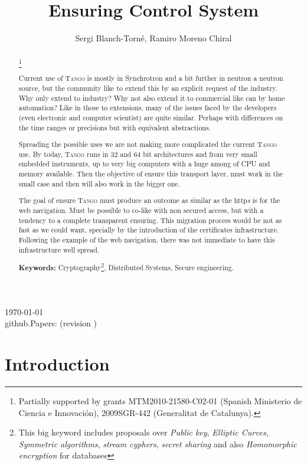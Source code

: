 \documentclass[10pt,a4paper,twoside]{llncs}
\title{Ensuring \tango Control System}
\author{Sergi Blanch-Torn\'e\inst{1}, Ramiro Moreno Chiral\inst{2}}
\institute{
 Escola Polit\`ecnica Superior, Universitat de Lleida. Spain.\\
 \email{\tt sblanch@alumnes.udl.es}
 \and 
 Departament de Matem\`atica. Universitat de Lleida. Spain.\\
 \email{\tt ramiro@matematica.udl.es}
 }
\newcommand{\version}{github.Papers: \gitCommitterDate\;(revision \gitAbbrevHash) }
\newcommand{\tango}{\textsc{Tango} }
\begin{document}
\maketitle
\begin{center}
 \today\\
 \version
\end{center}


\begin{abstract}\footnote{Partially supported by grants MTM2010-21580-C02-01 (Spanish Ministerio de Ciencia e Innovaci\'on), 2009SGR-442 (Generalitat de Catalunya).}

Current use of \tango is mostly in Synchrotron and a bit further in neutron a neutron source, but the community like to extend this by an explicit request of the industry. Why only extend to industry? Why not also extend it to commercial like can by home automation? Like in those to extensions, many of the issues faced by the developers (even electronic and computer scientist) are quite similar. Perhaps with differences on the time ranges or precisions but with equivalent abstractions.

Spreading the possible uses we are not making more complicated the current \tango use. By today, \tango runs in 32 and 64 bit architectures and from very small embedded instruments, up to very big computers with a huge among of CPU and memory available. Then the objective of ensure this transport layer, must work in the small case and then will also work in the bigger one.

The goal of ensure \tango must produce an outcome as similar as the http\emph{s} is for the web navigation. Must be possible to co-like with non secured access, but with a tendency to a complete transparent ensuring. This migration process would be not as fast as we could want, specially by the introduction of the certificates infrastructure. Following the example of the web navigation, there was not immediate to have this infrastructure well spread.
   
{\bf Keywords:} Cryptography\footnote{This big keyword includes proposals over \emph{Public key}, \emph{Elliptic Curves}, \emph{Symmetric algorithms}, \emph{stream cyphers}, \emph{secret sharing} and also \emph{Homomorphic encryption} for databases}, Distributed Systems, Secure engineering.

\end{abstract}

%
\section{Introduction \label{sec:intro}}
\end{document}
